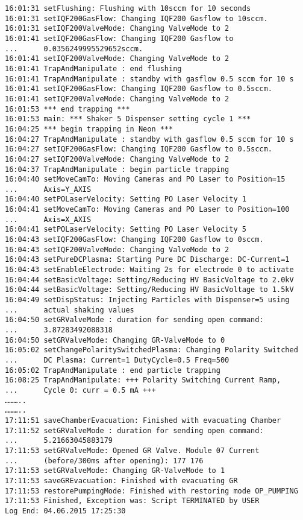 \begin{small}
\begin{verbatim}
16:01:31 setFlushing: Flushing with 10sccm for 10 seconds
16:01:31 setIQF200GasFlow: Changing IQF200 Gasflow to 10sccm.
16:01:31 setIQF200ValveMode: Changing ValveMode to 2
16:01:41 setIQF200GasFlow: Changing IQF200 Gasflow to
...      0.0356249995529652sccm.
16:01:41 setIQF200ValveMode: Changing ValveMode to 2
16:01:41 TrapAndManipulate : end flushing
16:01:41 TrapAndManipulate : standby with gasflow 0.5 sccm for 10 s
16:01:41 setIQF200GasFlow: Changing IQF200 Gasflow to 0.5sccm.
16:01:41 setIQF200ValveMode: Changing ValveMode to 2
16:01:53 *** end trapping ***
16:01:53 main: *** Shaker 5 Dispenser setting cycle 1 ***
16:04:25 *** begin trapping in Neon ***
16:04:27 TrapAndManipulate : standby with gasflow 0.5 sccm for 10 s
16:04:27 setIQF200GasFlow: Changing IQF200 Gasflow to 0.5sccm.
16:04:27 setIQF200ValveMode: Changing ValveMode to 2
16:04:37 TrapAndManipulate : begin particle trapping
16:04:40 setMoveCamTo: Moving Cameras and PO Laser to Position=15
...      Axis=Y_AXIS
16:04:40 setPOLaserVelocity: Setting PO Laser Velocity 1
16:04:41 setMoveCamTo: Moving Cameras and PO Laser to Position=100
...      Axis=X_AXIS
16:04:41 setPOLaserVelocity: Setting PO Laser Velocity 5
16:04:43 setIQF200GasFlow: Changing IQF200 Gasflow to 0sccm.
16:04:43 setIQF200ValveMode: Changing ValveMode to 2
16:04:43 setPureDCPlasma: Starting Pure DC Discharge: DC-Current=1
16:04:43 setEnableElectrode: Waiting 2s for electrode 0 to activate
16:04:44 setBasicVoltage: Setting/Reducing HV BasicVoltage to 2.0kV
16:04:44 setBasicVoltage: Setting/Reducing HV BasicVoltage to 1.5kV
16:04:49 setDispStatus: Injecting Particles with Dispenser=5 using
...      actual shaking values
16:04:50 setGRValveMode : duration for sending open command:
...      3.87283492088318
16:04:50 setGRValveMode: Changing GR-ValveMode to 0
16:05:02 setChangePolaritySwitchedPlasma: Changing Polarity Switched
...      DC Plasma: Current=1 DutyCycle=0.5 Freq=500
16:05:02 TrapAndManipulate : end particle trapping
16:08:25 TrapAndManipulate: +++ Polarity Switching Current Ramp,
...      Cycle 0: curr = 0.5 mA +++
………..
………..
17:11:51 saveChamberEvacuation: Finished with evacuating Chamber
17:11:52 setGRValveMode : duration for sending open command:
...      5.21663045883179
17:11:53 setGRValveMode: Opened GR Valve. Module 07 Current
...      (before/300ms after opening): 177 176
17:11:53 setGRValveMode: Changing GR-ValveMode to 1
17:11:53 saveGREvacuation: Finished with evacuating GR
17:11:53 restorePumpingMode: Finished with restoring mode OP_PUMPING
17:11:53 Finished, Exception was: Script TERMINATED by USER
Log End: 04.06.2015 17:25:30
\end{verbatim}
\end{small}

